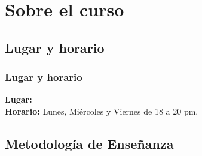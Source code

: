 \documentclass[12pt]{beamer}
\begin{document}

\section{Sobre el curso}
\subsection{Lugar y horario}

\begin{frame}
\frametitle{Lugar y horario} 
\textbf{Lugar: } 
\\
\bigskip
\textbf{Horario: } Lunes, Miércoles y Viernes de 18 a 20 pm.
\end{frame}

\subsection{Metodología de Enseñanza}
\end{document}
